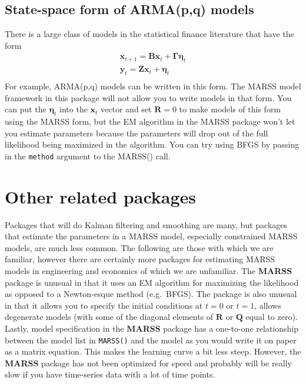 \documentclass[12pt,]{book}
\begin{document}
\hypertarget{state-space-form-of-armapq-models}{%
\section{State-space form of ARMA(p,q) models}\label{state-space-form-of-armapq-models}}

There is a large class of models in the statistical finance literature that have the form
\begin{equation*}
\begin{gathered}
\mathbf{x}_{t+1} = \mathbf{B}\mathbf{x}_t + \boldsymbol{\Gamma}\boldsymbol{\eta}_t\\
\mathbf{y}_t = \mathbf{Z}\mathbf{x}_t  + \boldsymbol{\eta}_t\\
\end{gathered}
\end{equation*}
For example, ARMA(p,q) models can be written in this form. The MARSS model framework in this package will not allow you to write models in that form. You can put the \(\boldsymbol{\eta}_t\) into the \(\mathbf{x}_t\) vector and set \(\mathbf{R}=0\) to make models of this form using the MARSS form, but the EM algorithm in the MARSS package won't let you estimate parameters because the parameters will drop out of the full likelihood being maximized in the algorithm. You can try using BFGS by passing in the \texttt{method} argument to the MARSS() call.

\hypertarget{other-related-packages}{%
\chapter{Other related packages}\label{other-related-packages}}

Packages that will do Kalman filtering and smoothing are many, but packages that estimate the parameters in a MARSS model, especially constrained MARSS models, are much less common. The following are those with which we are familiar, however there are certainly more packages for estimating MARSS models in engineering and economics of which we are unfamiliar. The \textbf{MARSS} package is unusual in that it uses an EM algorithm for maximizing the likelihood as opposed to a Newton-esque method (e.g.~BFGS). The package is also unusual in that it allows you to specify the initial conditions at \(t=0\) or \(t=1\), allows degenerate models (with some of the diagonal elements of \(\mathbf{R}\) or \(\mathbf{Q}\) equal to zero). Lastly, model specification in the \textbf{MARSS} package has a one-to-one relationship between the model list in \texttt{MARSS()} and the model as you would write it on paper as a matrix equation. This makes the learning curve a bit less steep. However, the \textbf{MARSS} package has not been optimized for speed and probably will be really slow if you have time-series data with a lot of time points.
\end{document}
